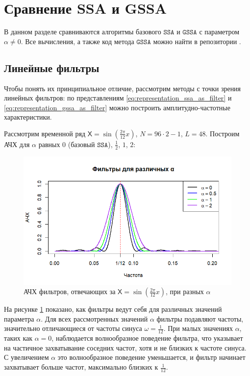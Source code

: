 \documentclass[12pt, specialist, subf
]{disser}
\theoremstyle{definition}
\newcommand{\SSA}{\texttt{SSA}}
\newcommand{\GSSA}{\texttt{GSSA}}
\newcommand{\TS}{\mathsf{X}}
\begin{document}
\section{Сравнение SSA и GSSA}
\label{sec:compare_ssa_gssa}
В данном разделе сравниваются алгоритмы базового $\SSA$ и $\GSSA$ с параметром $\alpha \not = 0$. Все вычисления, а также код метода $\GSSA$ можно найти в репозитории \cite{spbu_cissa_coursework_github}.


\subsection{Линейные фильтры}
Чтобы понять их принципиальное отличие, рассмотрим методы с точки зрения линейных фильтров: по представлениям \eqref{eq:representation_ssa_as_filter} и \eqref{eq:representation_gssa_as_filter} можно построить амплитудно-частотные характеристики.

Рассмотрим временной ряд $\TS = \sin\left(\frac{2\pi}{12}x\right)$, $N = 96 \cdot 2 - 1$, $L = 48$.
Построим АЧХ для $\alpha$ равных $0$ (базовый $\SSA$), $\frac{1}{2}$, $1$, $2$:
\begin{figure}[H]
	\centering
	\includegraphics[width=1\textwidth]{img/various_alphas.png}
	\caption{АЧХ фильтров, отвечающих за $\TS = \sin\left(\frac{2\pi}{12}x\right)$, при разных $\alpha$}
	\label{fig:various_alphas}
\end{figure}
На рисунке \ref{fig:various_alphas} показано, как фильтры ведут себя для различных значений параметра \(\alpha\). Для всех рассмотренных значений \(\alpha\) фильтры подавляют частоты, значительно отличающиеся от частоты синуса $ \omega = \frac{1}{12}$. При малых значениях \(\alpha\), таких как \(\alpha = 0\), наблюдается волнообразное поведение фильтра, что указывает на частичное захватывание соседних частот, хотя и не близких к частоте синуса. С увеличением \(\alpha\) это волнообразное поведение уменьшается, и фильтр начинает захватывает больше частот, максимально близких к \(\frac{1}{12}\).
\end{document}
